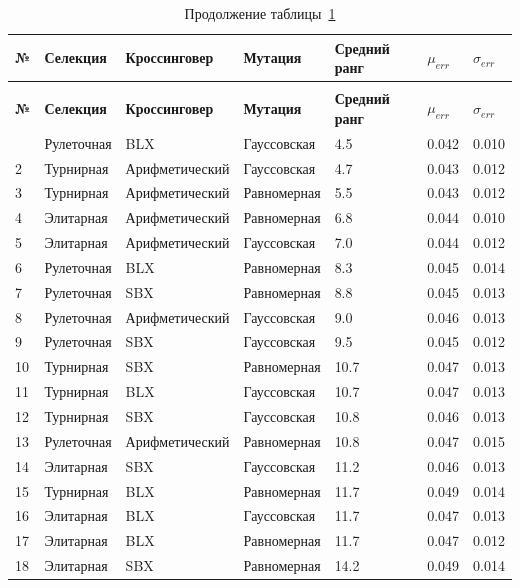 \begin{longtable}{|p{}|p{}|p{}|p{}|p{}|p{}|p{}|}
	\caption{Ранжирование алгоритмов по среднему рангу}\label{tbl:algorithm_ranking} \\
	\hline
	\textbf{№} & \textbf{Селекция} & \textbf{Кроссинговер} & \textbf{Мутация} & \textbf{Средний ранг} & \textbf{$\mu_{err}$} & \textbf{$\sigma_{err}$} \\
	\hline
	\endfirsthead
	\caption*{Продолжение таблицы~\ref{tbl:algorithm_ranking}} \\
	\hline
	\textbf{№} & \textbf{Селекция} & \textbf{Кроссинговер} & \textbf{Мутация} & \textbf{Средний ранг} & \textbf{$\mu_{err}$} & \textbf{$\sigma_{err}$} \\
	\hline
	\endhead
	\hline
	\endfoot
	\endlastfoot
	1 & Рулеточная & BLX & Гауссовская & 4.5 & 0.042 & 0.010 \\
	\hline
	2 & Турнирная & Арифметический & Гауссовская & 4.7 & 0.043 & 0.012 \\
	\hline
	3 & Турнирная & Арифметический & Равномерная & 5.5 & 0.043 & 0.012 \\
	\hline
	4 & Элитарная & Арифметический & Равномерная & 6.8 & 0.044 & 0.010 \\
	\hline
	5 & Элитарная & Арифметический & Гауссовская & 7.0 & 0.044 & 0.012 \\
	\hline
	6 & Рулеточная & BLX & Равномерная & 8.3 & 0.045 & 0.014 \\
	\hline
	7 & Рулеточная & SBX & Равномерная & 8.8 & 0.045 & 0.013 \\
	\hline
	8 & Рулеточная & Арифметический & Гауссовская & 9.0 & 0.046 & 0.013 \\
	\hline
	9 & Рулеточная & SBX & Гауссовская & 9.5 & 0.045 & 0.012 \\
	\hline
	10 & Турнирная & SBX & Равномерная & 10.7 & 0.047 & 0.013 \\
	\hline
	11 & Турнирная & BLX & Гауссовская & 10.7 & 0.047 & 0.013 \\
	\hline
	12 & Турнирная & SBX & Гауссовская & 10.8 & 0.046 & 0.013 \\
	\hline
	13 & Рулеточная & Арифметический & Равномерная & 10.8 & 0.047 & 0.015 \\
	\hline
	14 & Элитарная & SBX & Гауссовская & 11.2 & 0.046 & 0.013 \\
	\hline
	15 & Турнирная & BLX & Равномерная & 11.7 & 0.049 & 0.014 \\
	\hline
	16 & Элитарная & BLX & Гауссовская & 11.7 & 0.047 & 0.013 \\
	\hline
	17 & Элитарная & BLX & Равномерная & 11.7 & 0.047 & 0.012 \\
	\hline
	18 & Элитарная & SBX & Равномерная & 14.2 & 0.049 & 0.014 \\
	\hline
\end{longtable}


